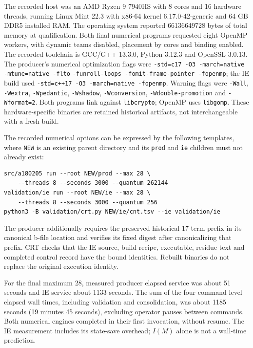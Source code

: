 \documentclass[11pt]{article}
\theoremstyle{definition}
\theoremstyle{remark}
\begin{document}
The recorded host was an AMD Ryzen 9 7940HS with 8 cores and 16 hardware
threads, running Linux Mint 22.3 with x86-64 kernel 6.17.0-42-generic and
64 GB DDR5 installed RAM. The operating system reported
66136649728 bytes of total memory at qualification.
Both final numerical programs requested eight OpenMP workers, with dynamic
teams disabled, placement by cores and binding enabled.
The recorded toolchain is GCC/G++ 13.3.0, Python 3.12.3 and OpenSSL 3.0.13.
The producer's numerical optimization flags were
\texttt{-std=c17 -O3 -march=native -mtune=native -flto}
\texttt{-funroll-loops -fomit-frame-pointer -fopenmp}; the IE build used
\texttt{-std=c++17 -O3 -march=native -fopenmp}. Warning flags were
\texttt{-Wall}, \texttt{-Wextra}, \texttt{-Wpedantic}, \texttt{-Wshadow},
\texttt{-Wconversion}, \texttt{-Wdouble-promotion} and \texttt{-Wformat=2}.
Both programs link against
\texttt{libcrypto}; OpenMP uses
\texttt{libgomp}. These hardware-specific binaries are retained historical
artifacts, not interchangeable with a fresh build.

The recorded numerical options can be expressed by the following templates,
where \texttt{NEW} is an existing parent directory and its
\texttt{prod} and \texttt{ie} children must not already exist:
\begin{small}
\begin{verbatim}
src/a180205 run --root NEW/prod --max 28 \
    --threads 8 --seconds 3000 --quantum 262144
validation/ie run --root NEW/ie --max 28 \
    --threads 8 --seconds 3000 --quantum 256
python3 -B validation/crt.py NEW/ie/cnt.tsv --ie validation/ie
\end{verbatim}
\end{small}
The producer additionally requires the preserved historical 17-term prefix
in its canonical b-file location and verifies its fixed digest after
canonicalizing that prefix. CRT checks that the IE source, build recipe,
executable, residue text and completed control record have the bound
identities. Rebuilt binaries do not replace the original execution identity.

For the final maximum 28, measured producer elapsed service was about
51 seconds and IE service about 1133 seconds. The sum of the four
command-level elapsed wall times, including validation and consolidation,
was about 1185 seconds (19 minutes 45 seconds), excluding operator pauses
between commands. Both numerical engines completed
in their first invocation, without resume. The IE measurement includes its
state-save overhead; $I(M)$ alone is not a wall-time prediction.
\end{document}
